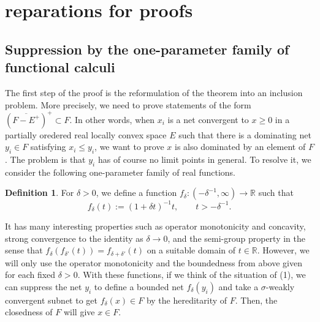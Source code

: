 \documentclass[noamsfonts,a4paper,10pt]{amsart}
\theoremstyle{plain}
\theoremstyle{definition}
\newtheorem{defn}[thm]{Definition}
\theoremstyle{remark}
\begin{document}
\section{reparations for proofs}


\subsection{Suppression by the one-parameter family of functional calculi}

The first step of the proof is the reformulation of the theorem into an inclusion problem.
More precisely, we need to prove statements of the form $(\overline{F-E^+})^+\subset F$.
In other words, when $x_i$ is a net convergent to $x\ge0$ in a partially oredered real locally convex space $E$ such that there is a dominating net $y_i\in F$ satisfying $x_i\le y_i$, we want to prove $x$ is also dominated by an element of $F$.
The problem is that $y_i$ has of course no limit points in general.
To resolve it, we consider the following one-parameter family of real functions.
\begin{defn}
For $\delta>0$, we define a function $f_\delta:(-\delta^{-1},\infty)\to\mathbb{R}$ such that
\[f_\delta(t):=(1+\delta t)^{-1}t,\qquad t>-\delta^{-1}.\]
\end{defn}
It has many interesting properties such as operator monotonicity and concavity, strong convergence to the identity as $\delta\to0$, and the semi-group property in the sense that $f_\delta(f_{\delta'}(t))=f_{\delta+\delta'}(t)$ on a suitable domain of $t\in\mathbb{R}$.
However, we will only use the operator monotonicity and the boundedness from above given for each fixed $\delta>0$.
With these functions, if we think of the situation of (1), we can suppress the net $y_i$ to define a bounded net $f_\delta(y_i)$ and take a $\sigma$-weakly convergent subnet to get $f_\delta(x)\in F$ by the hereditarity of $F$.
Then, the closedness of $F$ will give $x\in F$.
\end{document}
